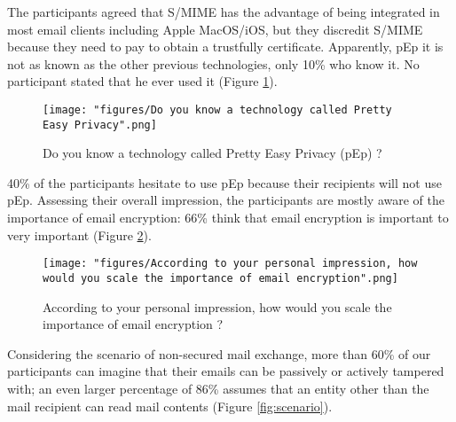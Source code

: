 \newline
The participants agreed that S/MIME has the advantage of being integrated in most email clients including Apple MacOS/iOS, but they discredit S/MIME because they need to pay to obtain a trustfully certificate.
\newline
Apparently, pEp it is not as known as the other previous technologies, only 10\% who know it. No participant stated that he ever used it (Figure \ref{fig:pep}).
\newline
\newline
\begin{figure}
	\texttt{[image: "figures/Do you know a technology called Pretty Easy Privacy".png]}
	\centering
	\caption{Do you know a technology called Pretty Easy Privacy (pEp) ?}
	\label{fig:pep}
\end{figure}
40\% of the participants hesitate to use pEp because their recipients will not use pEp.
\newline
Assessing their overall impression, the participants are mostly aware of the importance of email encryption: 66\% think that email encryption is important to very important (Figure \ref{fig:impression}).
\newline
\newline
\begin{figure}
	\texttt{[image: "figures/According to your personal impression, how would you scale the importance of email encryption".png]}
	\centering
	\caption{According to your personal impression, how would you scale the importance of email encryption ?}
	\label{fig:impression}
\end{figure}
Considering the scenario of non-secured mail exchange, more than 60\% of our participants can imagine that their emails can be passively or actively tampered with; an even larger percentage of 86\% assumes that an entity other than the mail recipient can read mail contents (Figure \ref{fig:scenario}).
\newline
\newline
